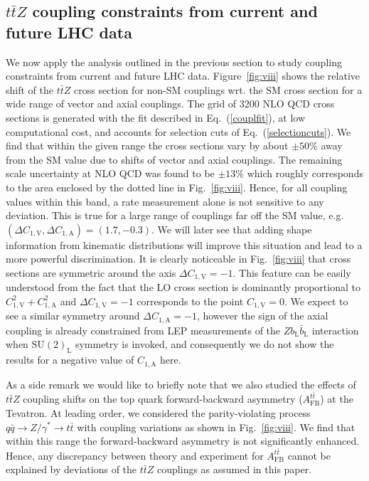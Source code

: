 \documentclass{JHEP3}
\def\ttbZ{t\bar{t}Z}
\def\ttb{t\bar{t}}
\def\ConeA{C_{1,\mathrm{A}}}
\def\ConeV{C_{1,\mathrm{V}}}
\begin{document}
\subsection{$\ttbZ$ coupling constraints from current and future LHC data}
\label{sect:CouplLimits}

We now apply the analysis outlined in the previous section to study coupling constraints from current and future LHC data.
Figure~\ref{fig:viii} shows the relative shift of the $\ttbZ$ cross section for non-SM couplings wrt. the SM cross section 
for a wide range of vector and axial couplings. 
The grid of 3200 NLO QCD cross sections is generated with the fit described in Eq.~(\ref{couplfit}), at low computational cost, 
and accounts for selection cuts of Eq.~(\ref{selectioncuts}).
We find that within the given range the cross sections vary by about $\pm 50\%$ away from the SM value due to shifts of vector and axial couplings.
The remaining scale uncertainty at NLO QCD was found to be $\pm 13\%$ which roughly corresponds to the area enclosed by the dotted line in Fig.~\ref{fig:viii}.
Hence, for all coupling values within this band, a rate measurement alone is not sensitive to any deviation.
This is true for a large range of couplings far off the SM value, e.g. $(\Delta\ConeV,\Delta\ConeA)=(1.7,-0.3)$.
We will later see that adding shape information from kinematic distributions will improve this situation and lead to a more powerful discrimination. 
It is clearly noticeable in Fig.~\ref{fig:viii} that cross sections are symmetric around the axis $\Delta\ConeV=-1$. 
This feature can be easily understood from the fact that the LO cross section is dominantly proportional to 
$\ConeV^2+\ConeA^2$ and $\Delta\ConeV=-1$ corresponds to the point $\ConeV=0$.
We expect to see a similar symmetry around $\Delta\ConeA=-1$, however  the sign of the axial coupling is already constrained from 
LEP measurements of the $Zb_\mathrm{L}\bar{b}_\mathrm{L}$ interaction when $\mathrm{SU(2)}_\mathrm{L}$ symmetry is invoked, and consequently we do not show the results for 
a negative value of $\ConeA$ here.


As a side remark we would like to briefly note that we also studied the effects of $\ttbZ$ coupling shifts on the top quark forward-backward asymmetry ($A_\mathrm{FB}^{\ttb}$) 
at the Tevatron.
At leading order, we considered the parity-violating process $q \bar{q} \to Z/\gamma^* \to \ttb$ with coupling variations as shown in Fig.~\ref{fig:viii}.
We find that within this range the forward-backward asymmetry is not significantly enhanced.
Hence, any discrepancy between theory and experiment for $A_\mathrm{FB}^{\ttb}$ cannot be explained by deviations of the $\ttbZ$ couplings as
assumed in this paper.
\end{document}
